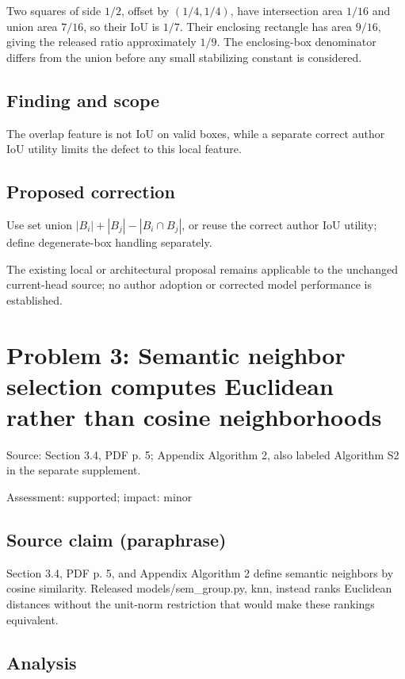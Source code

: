 \documentclass[11pt]{article}
\begin{document}
Two squares of side \(1/2\), offset by \((1/4,1/4)\), have intersection area \(1/16\) and union area \(7/16\), so their IoU is \(1/7\). Their enclosing rectangle has area \(9/16\), giving the released ratio approximately \(1/9\). The enclosing-box denominator differs from the union before any small stabilizing constant is considered.

\subsection*{Finding and scope}

The overlap feature is not IoU on valid boxes, while a separate correct author IoU utility limits the defect to this local feature.

\subsection*{Proposed correction}

Use set union \(|B_i|+|B_j|-|B_i\cap B_j|\), or reuse the correct author IoU utility; define degenerate-box handling separately.

The existing local or architectural proposal remains applicable to the unchanged current-head source; no author adoption or corrected model performance is established.

\section*{Problem 3: Semantic neighbor selection computes Euclidean rather than cosine neighborhoods}

Source: Section 3.4, PDF p. 5; Appendix Algorithm 2, also labeled Algorithm S2 in the separate supplement.

Assessment: supported; impact: minor

\subsection*{Source claim (paraphrase)}

Section 3.4, PDF p. 5, and Appendix Algorithm 2 define semantic neighbors by cosine similarity. Released models/sem\_group.py, knn, instead ranks Euclidean distances without the unit-norm restriction that would make these rankings equivalent.

\subsection*{Analysis}
\end{document}
